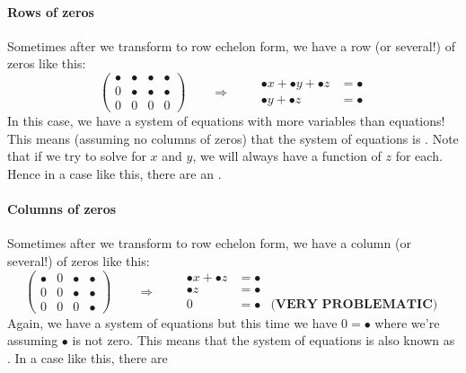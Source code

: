 \documentclass{ximera}
\begin{document}
\paragraph{Rows of zeros}

Sometimes after we transform to row echelon form, we have a row (or
several!) of zeros like this:
\[
\left(\begin{array}{ccc|c}
  \bullet &   \bullet & \bullet & \bullet  \\
  0 &   \bullet & \bullet & \bullet \\
  0& 0  & 0 & 0
\end{array}\right)
\qquad\Longrightarrow\qquad
\begin{aligned}
      \bullet x +  \bullet y + \bullet z &= \bullet \\
        \bullet y + \bullet z&= \bullet
\end{aligned}
\]
In this case, we have a system of equations with more variables than
equations! This means (assuming no columns of zeros) that the system
of equations is . Note that if we try to solve
for $x$ and $y$, we will always have a function of $z$ for each. Hence
in a case like this, there are an .



\paragraph{Columns of zeros}

Sometimes after we transform to row echelon form, we have a column (or
several!) of zeros like this:
\[
\left(\begin{array}{ccc|c}
  \bullet &   0 & \bullet & \bullet  \\
  0 &   0 & \bullet & \bullet \\
   0& 0  &  0 & \bullet
\end{array}\right)
\qquad\Longrightarrow\qquad
\begin{aligned}
      \bullet x  + \bullet z &= \bullet & \\
      \bullet z&= \bullet & \\
      0 &=\bullet & \textbf{(VERY PROBLEMATIC)}
\end{aligned}
\]
Again, we have a system of equations but this time we have $0 =
\bullet$ where we're assuming $\bullet$ is not zero.  This means that
the system of equations is  also known as
. In a case like this, there are 
\end{document}
